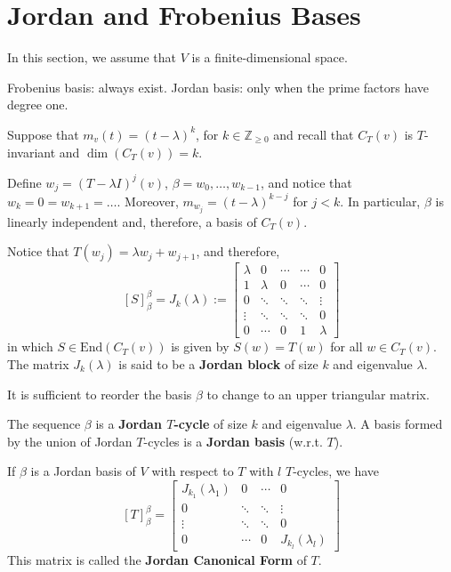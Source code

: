 \section{Jordan and Frobenius Bases}

In this section, we assume that $V$ is a finite-dimensional space.

Frobenius basis: always exist. Jordan basis: only when the prime factors have degree one.

Suppose that $m_v(t) = (t - \lambda)^k$, for $k \in \mathbb{Z}_{\geq 0}$ and recall that $C_T(v)$ is $T$-invariant and $\dim (C_T(v)) = k$.

Define $w_j = (T - \lambda I)^j (v)$, $\beta = w_0, \ldots, w_{k-1}$, and notice that $w_k = 0 = w_{k+1} = \ldots$. Moreover, $m_{w_j} = (t - \lambda)^{k-j}$ for $j < k$. In particular, $\beta$ is linearly independent and, therefore, a basis of $C_T(v)$.

Notice that $T(w_j) = \lambda w_j + w_{j+1}$, and therefore,
\[
	[S]_\beta^\beta = J_k(\lambda) := \begin{bmatrix}
		\lambda	& 0 		& \cdots 	& \cdots 	& 0 \\
		1		& \lambda 	& 0 		& \cdots 	& 0 \\
		0		& \ddots 	& \ddots 	& \ddots 	& \vdots \\
		\vdots	& \ddots	& \ddots 	& \ddots 	& 0 \\
		0		& \cdots	& 0 		& 1 		& \lambda
	\end{bmatrix}
\]
in which $S \in \text{End}(C_T(v))$ is given by $S(w) = T(w)$ for all $w \in C_T(v)$. The matrix $J_k(\lambda)$ is said to be a \textbf{Jordan block} of size $k$ and eigenvalue $\lambda$.

It is sufficient to reorder the basis $\beta$ to change to an upper triangular matrix.

The sequence $\beta$ is a \textbf{Jordan $T$-cycle} of size $k$ and eigenvalue $\lambda$. A basis formed by the union of Jordan $T$-cycles is a \textbf{Jordan basis} (w.r.t. $T$).

If $\beta$ is a Jordan basis of $V$ with respect to $T$ with $l$ $T$-cycles, we have
\[
	[T]_\beta^\beta = \begin{bmatrix}
	J_{k_1}(\lambda_1)	& 0 	 & \cdots	& 0 \\
	0					& \ddots & \ddots	& \vdots \\
	\vdots				& \ddots & \ddots 	& 0 \\
	0					& \cdots & 0 		& J_{k_l}(\lambda_l)
	\end{bmatrix}
\]
This matrix is called the \textbf{Jordan Canonical Form} of $T$.

